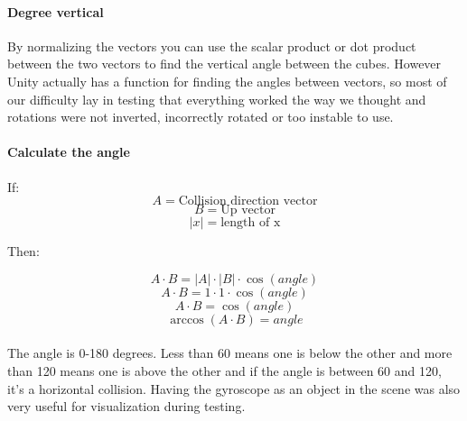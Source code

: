\paragraph{Degree vertical}
By normalizing the vectors you can use the scalar product or dot product between the two vectors to find the vertical angle between the cubes. However Unity actually has a function for finding the angles between vectors, so most of our difficulty lay in testing that everything worked the way we thought and rotations were not inverted, incorrectly rotated or too instable to use.


\paragraph{Calculate the angle}
\newcommand{\norm}[1]{\lvert #1 \rvert}

If:
\[
A = \text{Collision direction vector}
\]
\[
B = \text{Up vector}
\]
\[
\norm{x} = \text{length of x}
\]

Then:

\[
A \cdot B = \norm{A} \cdot \norm{B} \cdot \cos(angle)
\]
\[
A \cdot B = 1 \cdot 1 \cdot \cos(angle)
\]
\[
A \cdot B = \cos(angle)
\]
\[
\arccos(A \cdot B) = angle
\]


\paragraph{}
 The angle is 0-180 degrees. Less than 60 means one is below the other and more than 120 means one is above the other and if the angle is between 60 and 120, it's a horizontal collision. Having the gyroscope as an object in the scene was also very useful for visualization during testing.
